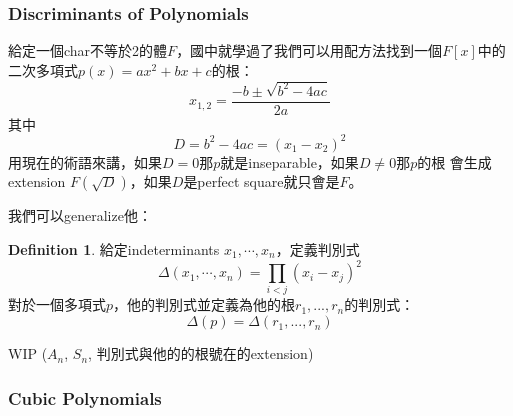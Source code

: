 \documentclass[12pt]{article}
\theoremstyle{definition}
\newtheorem{dfn}{Definition}
\newtheorem{prop}{Proposition}
\begin{document}






	

\subsubsection{Discriminants of Polynomials}

給定一個char不等於2的體$F$，國中就學過了我們可以用配方法找到一個$F[x]$中的二次多項式$p(x)=ax^2+bx+c$的根：
\[
x_{1,2}=\frac{-b\pm\sqrt{b^2-4ac}}{2a}	
\]
其中
\[
	D=b^2-4ac=(x_1-x_2)^2	
\]
用現在的術語來講，如果$D=0$那$p$就是inseparable，如果$D\neq 0$那$p$的根
會生成extension $F(\sqrt{D})$，如果$D$是perfect square就只會是$F$。

我們可以generalize他：

\begin{dfn}
	給定indeterminants $x_1,\cdots,x_n$，定義判別式
	\[
	\Delta(x_1,\cdots,x_n)=\prod_{i<j}(x_i-x_j)^2	
	\]
	對於一個多項式$p$，他的判別式並定義為他的根$r_1,...,r_n$的判別式：
	\[
	\Delta(p)=\Delta(r_1,...,r_n)
	\]
\end{dfn}

WIP ($A_n$, $S_n$, 判別式與他的的根號在的extension)

\subsubsection{Cubic Polynomials}
\end{document}
